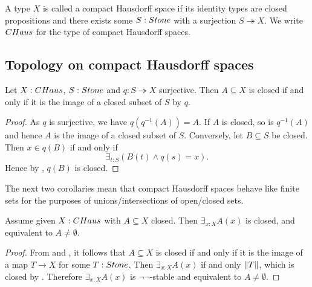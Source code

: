 \begin{definition}
  A type $X$ is called a compact Hausdorff space if its identity types are closed propositions and there exists some $S:\Stone$ with a surjection $S\twoheadrightarrow X$. We write $\CHaus$ for the type of compact Hausdorff spaces.
\end{definition}


\subsection{Topology on compact Hausdorff spaces}

\begin{lemma}\label{CompactHausdorffClosed}
  Let $X:\CHaus$, $S:\Stone$ and $q:S\twoheadrightarrow X$ surjective.
  Then $A\subseteq X$ is closed if and only if it is the image of a closed subset of $S$ by $q$. 
\end{lemma}
\begin{proof}
  As $q$ is surjective, we have $q(q^{-1}(A)) = A$.
  If $A$ is closed, so is $q^{-1}(A)$ and 
  hence $A$ is the image of a closed subset of $S$. 
  Conversely, let $B\subseteq S$ be closed. Then $x\in q(B)$ if and only if
   \[\exists_{t:S} (B(t) \wedge q(s) = x).\]
   Hence by , $q(B)$ is closed. 
\end{proof}

The next two corollaries mean that compact Hausdorff spaces behave like finite sets for the purposes of unions/intersections of open/closed sets.

\begin{corollary}\label{InhabitedClosedSubSpaceClosedCHaus}
Assume given $X:\Chaus$ with $A\subseteq X$ closed. Then $\exists_{x:X} A(x)$ is closed, and equivalent to $A \neq \emptyset$. 
\end{corollary}

\begin{proof}
From  and , it follows that $A\subseteq X$ is closed if and only if it is the image of a map $T\to X$ for some $T:\Stone$. Then $\exists_{x:X} A(x)$ if and only $\lVert T \rVert$, which is closed by . Therefore $\exists_{x:X} A(x)$ is $\neg\neg$-stable and equivalent to $A \neq \emptyset$. 
\end{proof}

